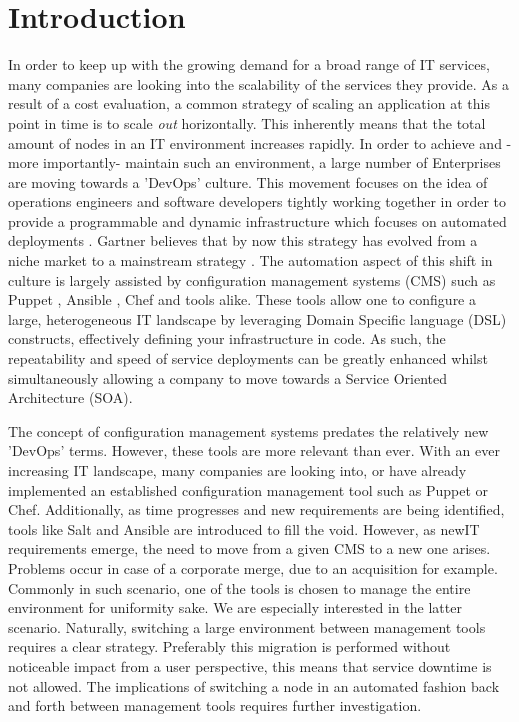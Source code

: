 \section{Introduction}\label{sec:introduction}
In order to keep up with the growing demand for a broad range of IT services, many companies are looking into the scalability of the services they provide. As a result of a cost evaluation, a common strategy of scaling an application at this point in time is to scale \textit{out} horizontally. This inherently means that the total amount of nodes in an IT environment increases rapidly. In order to achieve and -more importantly- maintain such an environment, a large number of Enterprises are moving towards a 'DevOps' culture. This movement focuses on the idea of operations engineers and software developers tightly working together in order to provide a programmable and dynamic infrastructure which focuses on automated deployments \cite{loukides_2012}. Gartner believes that by now this strategy has evolved from a niche market to a mainstream strategy \cite{gartner_2015}. The automation aspect of this shift in culture is largely assisted by configuration management systems (CMS) such as Puppet \cite{whatispuppet}, Ansible \cite{whatisansible}, Chef \cite{whatischef} and tools alike. These tools allow one to configure a large, heterogeneous IT landscape by leveraging Domain Specific language (DSL)  constructs, effectively defining your infrastructure in code. As such, the repeatability and speed of service deployments can be greatly enhanced whilst simultaneously allowing a company to move towards a Service Oriented Architecture (SOA).

The concept of configuration management systems predates the relatively new 'DevOps' terms. However, these tools are more relevant than ever. With an ever increasing IT landscape, many companies are looking into, or have already implemented an established configuration management tool such as Puppet or Chef. Additionally, as time progresses and new requirements are being identified, tools like Salt and Ansible are introduced to fill the void. However, as newIT requirements emerge, the need to move from a given CMS to a new one arises. Problems occur in case of a corporate merge, due to an acquisition for example. Commonly in such scenario, one of the tools is chosen to manage the entire environment for uniformity sake. We are especially interested in the latter scenario. Naturally, switching a large environment between management tools requires a clear strategy. Preferably this migration is performed without noticeable impact from a user perspective, this means that service downtime is not allowed. The implications of switching a node in an automated fashion back and forth between management tools requires further investigation. 

